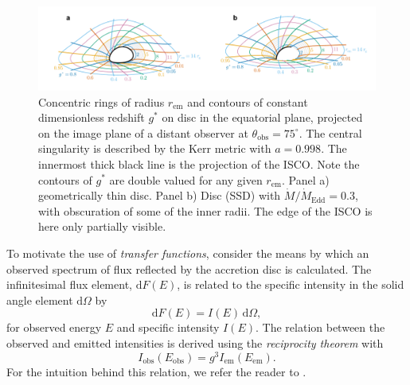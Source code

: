\documentclass[fleqn,usenatbib]{mnras}
\renewcommand{\d}{\text{d}}
\newcommand{\rhoem}{r_\text{em}}
\begin{document}
\begin{figure}
    \centering
    \includegraphics[width=0.95\linewidth]{figures/transfer-function.parameterization.pdf}
    \caption{Concentric rings of radius $\rhoem$ and contours of constant
    dimensionless redshift $g^\ast$ on disc in the equatorial plane, projected
on the image plane of a distant observer at $\theta_\text{obs} = 75^\circ$. The
central singularity is described by the Kerr metric with $a = 0.998$. The
innermost thick black line is the projection of the ISCO. Note the contours of
$g^\ast$ are double valued for any given $\rhoem$. Panel a) geometrically
thin disc. Panel b) \citet{shakura_black_1973} Disc (SSD) with $\dot{M} / \dot{M}_\text{Edd} = 0.3$, with
obscuration of some of the inner radii. The edge of the ISCO is here only
partially visible.}
    \label{fig:transfer-parameterisation}
\end{figure}

To motivate the use of \emph{transfer functions}, consider the means by which an
observed spectrum of flux reflected by the accretion disc is calculated. The infinitesimal
flux element, $\d F(E)$, is related to the specific intensity in the solid angle
element $\d \Omega$ by
\begin{equation}
    \label{eq:infinitesimal-flux}
    \d F(E) = I(E)\, \d \Omega,
\end{equation}
for observed energy $E$ and specific intensity $I (E)$. The relation between the
observed and emitted intensities is derived using the \emph{reciprocity theorem}
\citep[equivalently \emph{Liouville's theorem},][]{lindquist_louville_1966} with
\begin{equation}
\label{eq:liouville-theorem}
    I_\text{obs}\left( E_\text{obs}\right) = g^3 I_\text{em}\left(E_\text{em}\right).
\end{equation}
For the intuition behind this relation, we refer the reader to
\citet{ingram_public_2019}.
\end{document}
